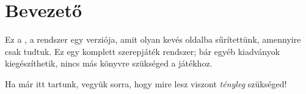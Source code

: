 \chapter{Bevezető}

Ez a , a  rendszer egy verziója, amit olyan kevés oldalba sűrítettünk, amennyire csak tudtuk. Ez egy komplett szerepjáték rendszer; bár egyéb kiadványok kiegészíthetik, nincs más könyvre szükséged a játékhoz.

Ha már itt tartunk, vegyük sorra, hogy mire lesz viszont \emph{tényleg} szükséged!



